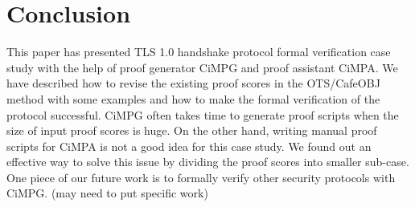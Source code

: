 \documentclass[a4paper,fleqn]{cas-dc}
\begin{document}
\section{Conclusion}\label{conclusion}
This paper has presented TLS 1.0 handshake protocol formal verification case study with the help of proof generator CiMPG and proof assistant CiMPA. We have described how to revise the existing proof scores in the OTS/CafeOBJ method with some examples and how to make the formal verification of the protocol successful. CiMPG often takes time to generate proof scripts when the size of input
proof scores is huge. On the other hand, writing manual proof scripts for CiMPA is not a good idea for this case study. We found out an effective way to solve this issue by dividing the proof scores into smaller sub-case. One piece of our future work is to formally verify other security protocols with CiMPG. (may need to put specific work)






\end{document}
